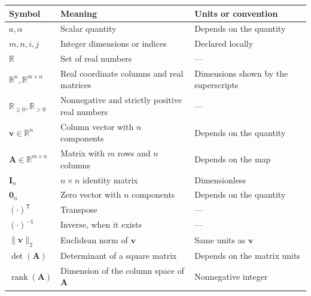\documentclass[
  australian,
  12pt,
  letterpaper,
  DIV=11,
  numbers=noendperiod,
  twoside]{scrreprt}
\newcounter{none} %
\begin{document}
{\def\LTcaptype{none} %
\begin{longtable}[]{@{}
  >{\raggedright\arraybackslash}p{}
  >{\raggedright\arraybackslash}p{}
  >{\raggedright\arraybackslash}p{}@{}}
\toprule\noalign{}
\begin{minipage}[b]{\linewidth}\raggedright
Symbol
\end{minipage} & \begin{minipage}[b]{\linewidth}\raggedright
Meaning
\end{minipage} & \begin{minipage}[b]{\linewidth}\raggedright
Units or convention
\end{minipage} \\
\midrule\noalign{}
\endhead
\bottomrule\noalign{}
\endlastfoot
\(a,\alpha\) & Scalar quantity & Depends on the quantity \\
\(m,n,i,j\) & Integer dimensions or indices & Declared locally \\
\(\mathbb R\) & Set of real numbers & --- \\
\(\mathbb R^n,\mathbb R^{m\times n}\) & Real coordinate columns and real
matrices & Dimensions shown by the superscripts \\
\(\mathbb R_{\geq0},\mathbb R_{>0}\) & Nonnegative and strictly positive
real numbers & --- \\
\(\mathbf{v}\in\mathbb{R}^n\) & Column vector with \(n\) components &
Depends on the quantity \\
\(\mathbf{A}\in\mathbb{R}^{m\times n}\) & Matrix with \(m\) rows and
\(n\) columns & Depends on the map \\
\(\mathbf{I}_n\) & \(n\times n\) identity matrix & Dimensionless \\
\(\mathbf{0}_n\) & Zero vector with \(n\) components & Depends on the
quantity \\
\((\cdot)^\mathsf{T}\) & Transpose & --- \\
\((\cdot)^{-1}\) & Inverse, when it exists & --- \\
\(\lVert\mathbf{v}\rVert_2\) & Euclidean norm of \(\mathbf{v}\) & Same
units as \(\mathbf{v}\) \\
\(\det(\mathbf A)\) & Determinant of a square matrix & Depends on the
matrix units \\
\(\operatorname{rank}(\mathbf A)\) & Dimension of the column space of
\(\mathbf A\) & Nonnegative integer \\

\end{longtable}}
\end{document}
